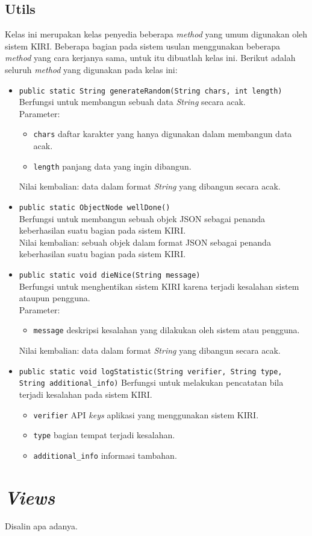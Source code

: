 \subsection{Utils}
\label{sec:utils}
Kelas ini merupakan kelas penyedia beberapa \textit{method} yang umum digunakan oleh sistem KIRI. Beberapa bagian pada sistem usulan menggunakan beberapa \textit{method} yang cara kerjanya sama, untuk itu dibuatlah kelas ini. Berikut adalah seluruh \textit{method} yang digunakan pada kelas ini:
\begin{itemize}
	\item \texttt{public static String generateRandom(String chars, int length)}\\
	Berfungsi untuk membangun sebuah data \textit{String} secara acak.\\
	Parameter:
	\begin{itemize}
		\item \texttt{chars} daftar karakter yang hanya digunakan dalam membangun data acak.
		\item \texttt{length} panjang data yang ingin dibangun.
	\end{itemize}
	Nilai kembalian: data dalam format \textit{String} yang dibangun secara acak.
	\item \texttt{public static ObjectNode wellDone()}\\
	Berfungsi untuk membangun sebuah objek JSON sebagai penanda keberhasilan suatu bagian pada sistem KIRI.\\
	Nilai kembalian: sebuah objek dalam format JSON sebagai penanda keberhasilan suatu bagian pada sistem KIRI.
	\item \texttt{public static void dieNice(String message)}\\
	Berfungsi untuk menghentikan sistem KIRI karena terjadi kesalahan sistem ataupun pengguna.\\
	Parameter:
	\begin{itemize}
		\item \texttt{message} deskripsi kesalahan yang dilakukan oleh sistem atau pengguna.
	\end{itemize}
	Nilai kembalian: data dalam format \textit{String} yang dibangun secara acak.
	\item \texttt{public static void logStatistic(String verifier, String type, String additional\_info)}
	Berfungsi untuk melakukan pencatatan bila terjadi kesalahan pada sistem KIRI.\\
	\begin{itemize}
		\item \texttt{verifier} API \textit{keys} aplikasi yang menggunakan sistem KIRI.
		\item \texttt{type} bagian tempat terjadi kesalahan.
		\item \texttt{additional\_info} informasi tambahan.
	\end{itemize}
\end{itemize}

\section{\textit{Views}}
\label{sec:viewssrancangan}
Disalin apa adanya.
